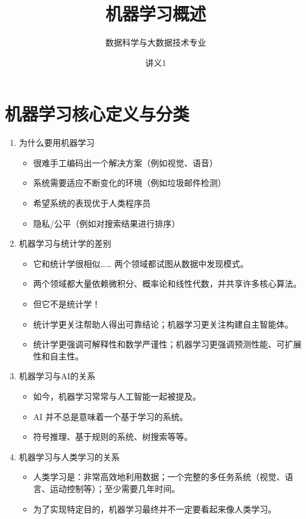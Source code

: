 \documentclass{article}
\theoremstyle{remark}
\theoremstyle{definition}
\theoremstyle{plain}
\numberwithin {equation}{section}
\numberwithin{assumption}{section}
\begin{document}
\title{机器学习概述}
\author{数据科学与大数据技术专业}
\date{讲义1}
\maketitle


\section{机器学习核心定义与分类}

\begin{enumerate}
  \item 为什么要用机器学习
    \begin{itemize}
      \item 很难手工编码出一个解决方案（例如视觉、语音）
      \item 系统需要适应不断变化的环境（例如垃圾邮件检测）
      \item 希望系统的表现优于人类程序员
      \item 隐私/公平（例如对搜索结果进行排序）
    \end{itemize}
  \item 机器学习与统计学的差别
    \begin{itemize}
      \item 它和统计学很相似…… 两个领域都试图从数据中发现模式。
      \item 两个领域都大量依赖微积分、概率论和线性代数，并共享许多核心算法。
      \item 但它不是统计学！
      \item 统计学更关注帮助人得出可靠结论；机器学习更关注构建自主智能体。
      \item 统计学更强调可解释性和数学严谨性；机器学习更强调预测性能、可扩展性和自主性。
    \end{itemize}
  \item 机器学习与AI的关系
    \begin{itemize}
      \item 如今，机器学习常常与人工智能一起被提及。
      \item AI 并不总是意味着一个基于学习的系统。
      \item 符号推理、基于规则的系统、树搜索等等。
    \end{itemize}
  \item 机器学习与人类学习的关系
    \begin{itemize}
      \item 人类学习是：非常高效地利用数据；一个完整的多任务系统（视觉、语言、运动控制等）；至少需要几年时间。
      \item 为了实现特定目的，机器学习最终并不一定要看起来像人类学习。

\end{itemize}
\end{enumerate}
\end{document}
